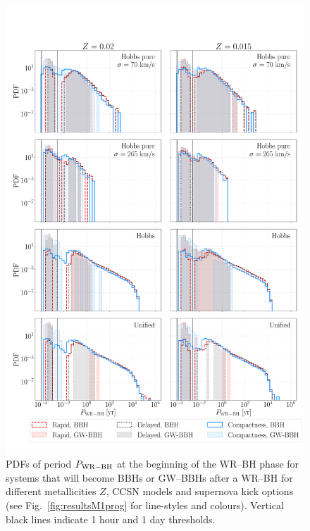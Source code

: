 \documentclass[a4paper,titlepage]{book}     	%
\begin{document}
\begin{figure}[h!]
	\centering
	\includegraphics[width=\textwidth]{./images/WRBH-P.pdf}	
	\caption{PDFs of period $P_{\rm WR-BH}$ at the beginning of the WR--BH phase for systems that will become BBHs or GW--BBHs after a WR--BH for different metallicities $Z$, CCSN models and supernova kick options (see Fig.\ \ref{fig:resultsM1prog} for line-styles and colours). Vertical black lines indicate 1 hour and 1 day thresholds.}\label{fig:resultsWRBH-P}
\end{figure}







\clearpage
\end{document}
